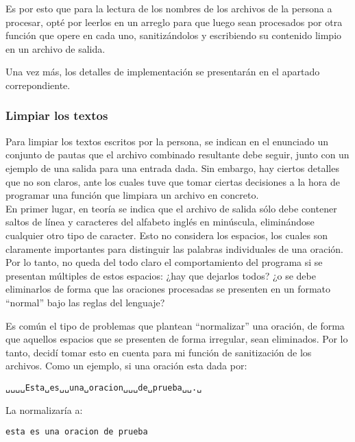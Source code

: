 \documentclass[a4paper]{article}
\begin{document}
Es por esto que para la lectura de los nombres de los archivos de la persona a procesar, opté por leerlos en un arreglo para que luego sean procesados por otra función que opere en cada uno, sanitizándolos y escribiendo su contenido limpio en un archivo de salida.

Una vez más, los detalles de implementación se presentarán en el apartado correpondiente.

\subsubsection{Limpiar los textos}

Para limpiar los textos escritos por la persona, se indican en el enunciado un conjunto de pautas que el archivo combinado resultante debe seguir, junto con un ejemplo de una salida para una entrada dada. Sin embargo, hay ciertos detalles que no son claros, ante los cuales tuve que tomar ciertas decisiones a la hora de programar una función que limpiara un archivo en concreto. \\

En primer lugar, en teoría se indica que el archivo de salida sólo debe contener saltos de línea y caracteres del alfabeto inglés en minúscula, eliminándose cualquier otro tipo de caracter. Esto no considera los espacios, los cuales son claramente importantes para distinguir las palabras individuales de una oración. Por lo tanto, no queda del todo claro el comportamiento del programa si se presentan múltiples de estos espacios: ¿hay que dejarlos todos? ¿o se debe eliminarlos de forma que las oraciones procesadas se presenten en un formato ``normal'' bajo las reglas del lenguaje?

Es común el tipo de problemas que plantean ``normalizar'' una oración, de forma que aquellos espacios que se presenten de forma irregular, sean eliminados. Por lo tanto, decidí tomar esto en cuenta para mi función de sanitización de los archivos. Como un ejemplo, si una oración esta dada por:

\begin{tcolorbox}
    \texttt{␣␣␣␣Esta␣es␣␣una␣oracion␣␣␣de␣prueba␣␣.␣}
\end{tcolorbox}

\noindent{}La normalizaría a:

\begin{tcolorbox}
    \texttt{esta es una oracion de prueba}
\end{tcolorbox}

\vspace{10pt}
\end{document}
